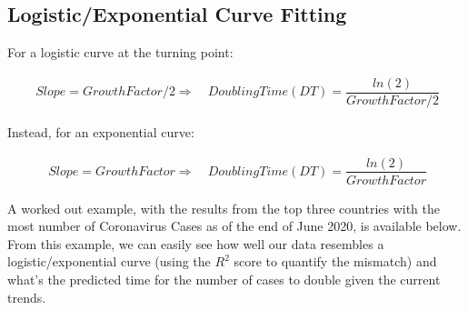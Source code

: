 \begin{appendices}
\renewcommand\thefigure{\thesection.\arabic{figure}} 
\setcounter{figure}{0}

\renewcommand{\thesection}{\Alph{section}}

 
 
\lstset{style=mystyle}

\section{Logistic/Exponential Curve Fitting}
\label{exp_fit}

For a logistic curve at the turning point: 

\useshortskip
\begin{align}
\ Slope = Growth Factor/2 \Rightarrow\quad Doubling Time (DT) = \dfrac{ln(2)}{Growth Factor/2}
\end{align}
\useshortskip

Instead, for an exponential curve:

\useshortskip
\begin{align}
\ Slope = Growth Factor \Rightarrow\quad Doubling Time (DT) = \dfrac{ln(2)}{Growth Factor}
\end{align}
\useshortskip

A worked out example, with the results from the top three countries with the most number of Coronavirus Cases as of the end of June 2020, is available below. From this example, we can easily see how well our data resembles a logistic/exponential curve (using the $R^{2}$ score to quantify the mismatch) and what's the predicted time for the number of cases to double given the current trends.


\end{appendices}
